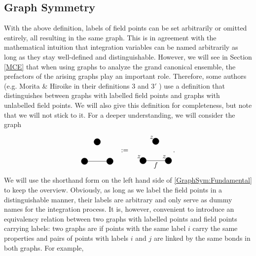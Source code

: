 \documentclass[8.5pt,twoside,twocolumn]{article}
\theoremstyle{standard}
\begin{document}
\subsection{Graph Symmetry}
\label{GraphSym}

With the above definition, labels of field points can be set arbitrarily or omitted entirely,
all resulting in the same graph. This is in agreement with the mathematical intuition that
integration variables can be named arbitrarily as long as they stay well-defined and
distinguishable. However, we will see in Section \ref{MCE} that when using graphs to
analyze the grand canonical ensemble, the prefactors of the arising graphs play an important
role. Therefore, some authors (e.g. Morita \& Hiroike in their definitions $3$ and $3'$ \cite{MoritaHiroike})
use a definition that distinguishes between graphs with labelled field points and graphs with unlabelled
field points. We will also give this definition for completeness, but note that we will not stick to it.
For a deeper understanding, we will consider the graph
\newcommand\exgraph[3]{
  \draw(0,0) node[circle,minimum size=.2cm,draw,fill=black] (A) {};
  \draw(1.3,0) node[circle,minimum size=.2cm,draw,fill=black] (B) {};
  \draw(.65,1) node[circle,minimum size=.2cm,draw,fill=black] (C) {};
  \draw (A.center) -- (B.center);
  \node [below right] at (A) {#1};
  \node [below right] at (B) {#2};
  \node [below right] at (C) {#3};
  }
  \begin{equation}
\begin{tikzpicture}[baseline={(current bounding box.center)}]
  \exgraph{}{}{}
\end{tikzpicture} \ \ :=\ \ 
\begin{tikzpicture}[baseline={(current bounding box.center)}]
  \exgraph{}{}{}
  \node at (.65,-.25) {$f$};
  \node [above left] at (A) {$z$};
  \node [above left] at (B) {$z$};
  \node [above left] at (C) {$z$};
\end{tikzpicture}.
\label{GraphSym:Fundamental}
\end{equation}
We will use the shorthand form on the left hand side of \eqref{GraphSym:Fundamental} to
keep the overview. Obviously, as long as we label the field points in a
distinguishable manner, their labels are arbitrary and only serve as dummy names
for the integration process.
It is, however, convenient to introduce an equivalency relation between
two graphs with labelled points and field points carrying labels: two graphs are
\ep{topologically indistinguishable} if points with the same label $i$ carry the same properties and pairs of points with
labels $i$ and $j$ are linked by the same bonds in both graphs. For example,
\end{document}
